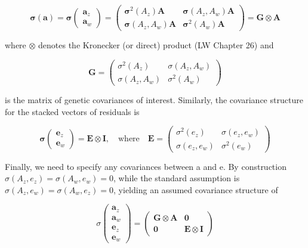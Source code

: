 \documentclass{article}
\begin{document}
\begin{equation}
\boldsymbol{\sigma}\left(\mathbf{a}\right)=\boldsymbol{\sigma}\begin{pmatrix}\mathbf{a}_{z}\\ \mathbf{a}_{w}\end{pmatrix}=\begin{pmatrix}\boldsymbol{\sigma}^{2}(A_{z})\mathbf{A}&\boldsymbol{\sigma}(A_{z},A_{w})\mathbf{A}\\ \boldsymbol{\sigma}(A_{z},A_{w})\mathbf{A}&\boldsymbol{\sigma}^{2}(A_{w})\mathbf{A}\end{pmatrix}=\mathbf{G}\otimes\mathbf{A}
\tag{20.27b}
\label{eq:20_27b}
\end{equation}

where  $ \otimes $ denotes the Kronecker (or direct) product (LW Chapter 26) and

\begin{equation}
\mathbf{G}=\begin{pmatrix}\sigma^{2}(A_{z})&\sigma(A_{z},A_{w})\\ \sigma(A_{z},A_{w})&\sigma^{2}(A_{w})\end{pmatrix}
\tag{20.27c}
\label{eq:20_27c}
\end{equation}

is the matrix of genetic covariances of interest. Similarly, the covariance structure for the stacked vectors of residuals is

\begin{equation}
\boldsymbol{\sigma}\begin{pmatrix}\mathbf{e}_{z}\\ \mathbf{e}_{w}\end{pmatrix}=\mathbf{E}\otimes\mathbf{I},\quad\mathrm{w h e r e}\quad\mathbf{E}=\begin{pmatrix}\sigma^{2}(e_{z})&\sigma(e_{z},e_{w})\\ \sigma(e_{z},e_{w})&\sigma^{2}(e_{w})\end{pmatrix}
\tag{20.27d}
\label{eq:20_27d}
\end{equation}

Finally, we need to specify any covariances between a and e. By construction  $ \sigma(A_{z}, e_{z}) = \sigma(A_{w}, e_{w}) = 0 $, while the standard assumption is  $ \sigma(A_{z}, e_{w}) = \sigma(A_{w}, e_{z}) = 0 $, yielding an assumed covariance structure of

\begin{equation}
\sigma\begin{pmatrix}{{{\mathbf{a}_{z}}}} \\{{{\mathbf{a}_{w}}}} \\{{{\mathbf{e}_{z}}}} \\{{{\mathbf{e}_{w}}}}\end{pmatrix}=\begin{pmatrix}{{{\mathbf{G}\otimes\mathbf{A}}}}&{{{\mathbf{0}}}} \\{{{\mathbf{0}}}}&{{{\mathbf{E}\otimes\mathbf{I}}}}\end{pmatrix}
\tag{20.27e}
\label{eq:20_27e}
\end{equation}
\end{document}
